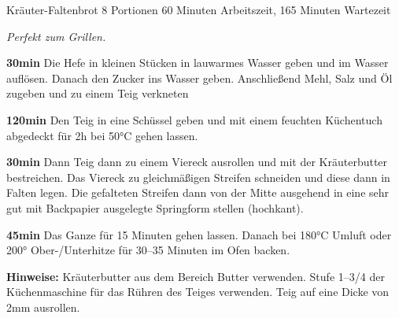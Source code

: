 \begin{recipe}{Kräuter-Faltenbrot} {8 Portionen} {60 Minuten Arbeitszeit, 165 Minuten Wartezeit}

  \freeform
  \textit{Perfekt zum Grillen.}


  \textbf{30min}
  Die Hefe in kleinen Stücken in lauwarmes Wasser geben und im Wasser auflösen.
  Danach den Zucker ins Wasser geben.
  Anschließend Mehl, Salz und Öl zugeben und zu einem Teig verkneten

  \newstep
  \textbf{120min}
  Den Teig in eine Schüssel geben und mit einem feuchten Küchentuch abgedeckt für 2h bei 50°C gehen lassen.

  \newstep
  \textbf{30min}
  Dann Teig dann zu einem Viereck ausrollen und mit der Kräuterbutter bestreichen.
  Das Viereck zu gleichmäßigen Streifen schneiden und diese dann in Falten legen.
  Die gefalteten Streifen dann von der Mitte ausgehend in eine sehr gut mit Backpapier ausgelegte Springform stellen (hochkant).

  \newstep
  \textbf{45min}
  Das Ganze für 15 Minuten gehen lassen.
  Danach bei 180°C Umluft oder 200° Ober-/Unterhitze für 30--35 Minuten im Ofen backen.

  \freeform
  \hrulefill

  \freeform
  \textbf{Hinweise:}
  Kräuterbutter aus dem Bereich Butter verwenden.
  Stufe 1--3/4 der Küchenmaschine für das Rühren des Teiges verwenden.
  Teig auf eine Dicke von 2mm ausrollen.

  \end{recipe}
